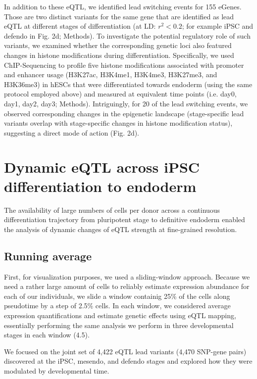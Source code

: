 In addition to these eQTL, we identified lead switching events for 155 eGenes. 
Those are two distinct variants for the same gene that are identified as lead eQTL at different stages of differentiation (at LD: $r^2<0.2$; for example iPSC and defendo in Fig. 2d; Methods). 
To investigate the potential regulatory role of such variants, we examined whether the corresponding genetic loci also featured changes in histone modifications during differentiation. 
Specifically, we used ChIP-Sequencing to profile five histone modifications associated with promoter and enhancer usage (H3K27ac, H3K4me1, H3K4me3, H3K27me3, and H3K36me3) in hESCs that were differentiated towards endoderm (using the same protocol employed above) and measured at equivalent time points (i.e. day0, day1, day2, day3; Methods). 
Intriguingly, for 20 of the lead switching events, we observed corresponding changes in the epigenetic landscape (stage-specific lead variants overlap with stage-specific changes in histone modification status), suggesting a direct mode of action (Fig. 2d).

\section{Dynamic eQTL across iPSC differentiation to endoderm}

The availability of large numbers of cells per donor across a continuous differentiation trajectory from pluripotent stage to definitive endoderm enabled the analysis of dynamic changes of eQTL strength at fine-grained resolution. 

\subsection{Running average}

First, for visualization purposes, we used a sliding-window approach. 
Because we need a rather large amount of cells to reliably estimate expression abundance for each of our individuals, we slide a window containig 25\% of the cells along pseudotime by a step of 2.5\% cells.
In each window, we considered average expression quantifications and estimate genetic effects using eQTL mapping, essentially performing the same analysis we perform in three developmental stages in each window (4.5). 

We focused on the joint set of 4,422 eQTL lead variants (4,470 SNP-gene pairs) discovered at the iPSC, mesendo, and defendo stages and explored how they were modulated by developmental time.

